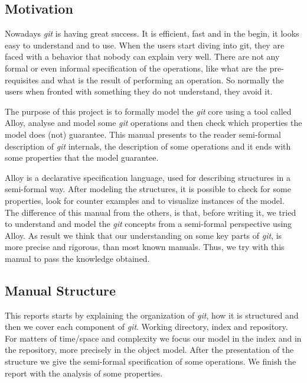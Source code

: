 \subsection{Motivation}
Nowadays \emph{git} is having great success. It is efficient, fast and
in the begin, it looks easy to understand and to use. When
the users start diving into git, they are faced with a behavior that
nobody can explain very well. There are not any formal or even informal
specification of the operations, like what are the pre-requisites and
what is the result of performing an operation. So normally the users
when fronted with something they do not understand, they avoid it.\par
The purpose of this project is to
formally model the \emph{git} core using a tool called 
Alloy, analyse and model some \emph{git}
operations and then check which properties the model does (not)
guarantee. This manual presents to the reader semi-formal description of
\emph{git} internals, the description of some operations and it ends with
some properties that the model guarantee.\par
Alloy is a declarative specification language, used for describing structures in 
a semi-formal way. After modeling the structures, it is possible to
check for some properties, look for counter examples and to visualize 
instances of the model. \\

The difference of this manual from the others, is
that, before writing it, we tried to understand and model 
the \emph{git} concepts from a semi-formal perspective using Alloy. As result 
we think that our understanding on some key parts of \emph{git}, is more precise
and rigorous, than most known manuals. Thus, we try with this manual
to pass the knowledge obtained. \par 

\subsection{Manual Structure}
This reports starts by explaining the organization of \emph{git}, how
it is structured and then we cover each component of \emph{git}. 
Working directory, index and repository. For matters
of time/space and complexity we focus our model in the index and in the
repository, more precisely in the object model. 
After the presentation of the structure we give the semi-formal
specification of some operations. We finish the report with the
analysis of some properties.


